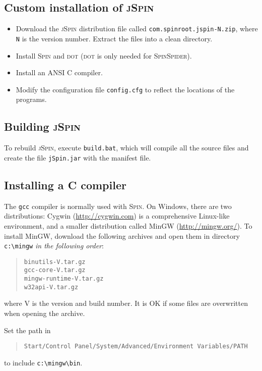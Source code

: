 \documentclass[11pt]{article}
\newcommand{\spn}{\textsc{Spin}}
\newcommand{\js}{\textsc{jSpin}}
\newcommand{\p}[1]{\texttt{#1}}
\begin{document}
\subsection{Custom installation of \js{}}
\begin{itemize}
\item Download the \js{} distribution file called \p{com.spinroot.jspin-N.zip},
where \p{N} is the version number.
Extract the files into a clean directory.

\item Install \spn{} and \textsc{dot} (\textsc{dot} is only needed for
\textsc{SpinSpider}).

\item Install an ANSI C compiler.

\item Modify the configuration file \p{config.cfg} to reflect the
locations of the programs.
\end{itemize}

\subsection{Building \js{}}

To rebuild \js{}, execute \p{build.bat}, which will compile all the source
files and create the file \p{jSpin.jar} with the manifest file.

\subsection{Installing a C compiler}\label{a.c}
The \p{gcc} compiler is normally used with \spn{}. On Windows, there are
two distributions: Cygwin (\url{http://cygwin.com}) is a comprehensive
Linux-like environment, and a smaller distribution called MinGW
(\url{http://mingw.org/}). To install MinGW, download the following archives and
open them in directory \verb=c:\mingw= \emph{in the following order}:
\begin{quote}
\p{binutils-V.tar.gz}\\
\p{gcc-core-V.tar.gz}\\
\p{mingw-runtime-V.tar.gz}\\
\p{w32api-V.tar.gz}
\end{quote}
where V is the version and build number.
It is OK if some files are overwritten when opening the archive.

Set the path in
\begin{quote}
\p{Start/Control Panel/System/Advanced/Environment Variables/PATH}
\end{quote}
to include \verb=c:\mingw\bin=.
\end{document}
